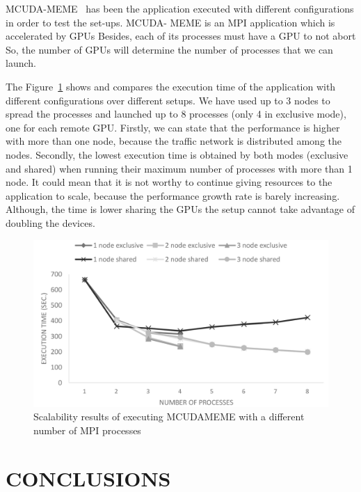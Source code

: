 \documentclass[a4paper,twoside]{article}
\begin{document}
MCUDA-MEME~\cite{Liu2010} has been the application executed with
different configurations in order to test the set-ups. MCUDA-
MEME is an MPI application which is accelerated by GPUs
Besides, each of its processes must have a GPU to not abort 
So, the number of GPUs will determine the number of processes that we can launch.

The Figure~\ref{fig3} shows and compares the execution time of
the application with different configurations over different setups. 
We have used up to 3 nodes to spread the processes and launched up to 8 processes (only 4 in exclusive mode), one for each remote GPU.
Firstly, we can state that the performance is higher with more than one node, because the traffic network is distributed among the nodes.
Secondly, the lowest execution time is obtained by both modes (exclusive and shared) when running their maximum number of processes with more than 1 node.
It could mean that it is not worthy to continue giving resources to the application to scale, because the performance growth rate is barely increasing.
Although, the time is lower sharing the GPUs the setup cannot take advantage of doubling the devices.

\begin{figure}[htb]
  \centering
  \includegraphics[width=\linewidth]{images/mcudameme-os.pdf}
  \caption{Scalability results of executing MCUDAMEME with a different number of MPI processes}
  \label{fig3}
\end{figure}


\section{\uppercase{Conclusions}}
\label{sec:conclusions}
\end{document}
